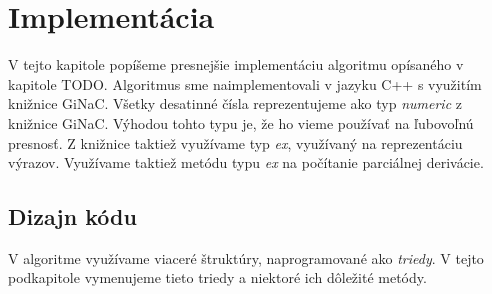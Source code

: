 \chapter{Implementácia}
\label{kap:implementation}

V tejto kapitole popíšeme presnejšie implementáciu algoritmu opísaného v kapitole TODO.
Algoritmus sme naimplementovali v jazyku C++ s využitím knižnice GiNaC. Všetky desatinné čísla
reprezentujeme ako typ \textit{numeric} z knižnice GiNaC. Výhodou tohto typu je, že ho vieme 
používať na ľubovoľnú presnosť. Z knižnice taktiež využívame typ \textit{ex}, využívaný na 
reprezentáciu výrazov. Využívame taktiež metódu typu \textit{ex} na počítanie parciálnej derivácie.

\section{Dizajn kódu}

V algoritme využívame viaceré štruktúry, naprogramované ako \textit{triedy}. V tejto podkapitole
vymenujeme tieto triedy a niektoré ich dôležité metódy.

